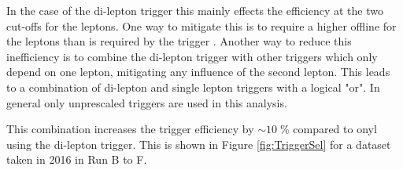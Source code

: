 In the case of the di-lepton trigger this mainly effects the efficiency at the two \pt cut-offs for the leptons. One way to mitigate this is to
require a higher offline \pt for the leptons than is required by the trigger .
Another way to reduce this inefficiency is to combine the di-lepton trigger with other triggers which only depend on one lepton, mitigating any
influence of the second lepton. This leads to a combination of di-lepton and single lepton triggers with a logical "or".
In general only unprescaled triggers are used in this analysis.

This combination increases the trigger efficiency by $\sim 10 \; \%$ compared to onyl using the di-lepton trigger.
This is shown in Figure \ref{fig:TriggerSel} for a dataset taken in 2016 in Run B to F.

\begin{figure}[htbp!]
  \begin{center}

\end{center}
\end{figure}
